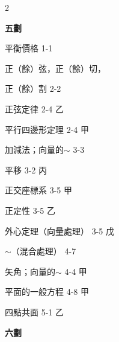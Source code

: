 \begin{multicols}{2}
\vspace{0.8em}
\begin{center}
\textbf{\large 五\quad 劃}
\end{center}

\noindent 平衡價格 \hfill 1-1\par
\noindent 正（餘）弦，正（餘）切，\par
\noindent\hspace*{1.5em} 正（餘）割 \hfill 2-2\par
\noindent 正弦定律 \hfill 2-4 乙\par
\noindent 平行四邊形定理 \hfill 2-4 甲\par
\noindent 加減法；向量的$\sim$ \hfill 3-3\par
\noindent 平移 \hfill 3-2 丙\par
\noindent 正交座標系 \hfill 3-5 甲\par
\noindent 正定性 \hfill 3-5 乙\par
\noindent 外心定理（向量處理） \hfill 3-5 戊\par
\noindent\hspace*{1.5em} $\sim$（混合處理） \hfill 4-7\par
\noindent 矢角；向量的$\sim$ \hfill 4-4 甲\par
\noindent 平面的一般方程 \hfill 4-8 甲\par
\noindent 四點共面 \hfill 5-1 乙\par

\vspace{0.8em}
\begin{center}
\textbf{\large 六\quad 劃}
\end{center}


\end{multicols}
